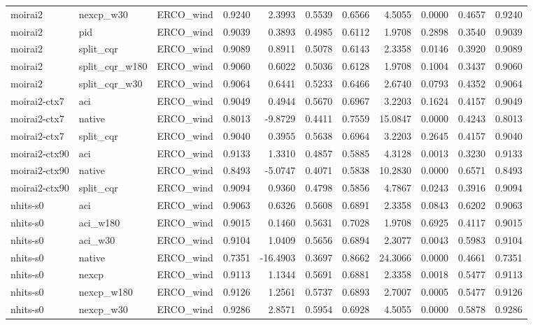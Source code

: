 \begin{tabular}{lllrrrrrrrr}
moirai2 & nexcp_w30 & ERCO_wind & 0.9240 & 2.3993 & 0.5539 & 0.6566 & 4.5055 & 0.0000 & 0.4657 & 0.9240 \\
moirai2 & pid & ERCO_wind & 0.9039 & 0.3893 & 0.4985 & 0.6112 & 1.9708 & 0.2898 & 0.3540 & 0.9039 \\
moirai2 & split_cqr & ERCO_wind & 0.9089 & 0.8911 & 0.5078 & 0.6143 & 2.3358 & 0.0146 & 0.3920 & 0.9089 \\
moirai2 & split_cqr_w180 & ERCO_wind & 0.9060 & 0.6022 & 0.5036 & 0.6128 & 1.9708 & 0.1004 & 0.3437 & 0.9060 \\
moirai2 & split_cqr_w30 & ERCO_wind & 0.9064 & 0.6441 & 0.5233 & 0.6466 & 2.6740 & 0.0793 & 0.4352 & 0.9064 \\
moirai2-ctx7 & aci & ERCO_wind & 0.9049 & 0.4944 & 0.5670 & 0.6967 & 3.2203 & 0.1624 & 0.4157 & 0.9049 \\
moirai2-ctx7 & native & ERCO_wind & 0.8013 & -9.8729 & 0.4411 & 0.7559 & 15.0847 & 0.0000 & 0.4243 & 0.8013 \\
moirai2-ctx7 & split_cqr & ERCO_wind & 0.9040 & 0.3955 & 0.5638 & 0.6964 & 3.2203 & 0.2645 & 0.4157 & 0.9040 \\
moirai2-ctx90 & aci & ERCO_wind & 0.9133 & 1.3310 & 0.4857 & 0.5885 & 4.3128 & 0.0013 & 0.3230 & 0.9133 \\
moirai2-ctx90 & native & ERCO_wind & 0.8493 & -5.0747 & 0.4071 & 0.5838 & 10.2830 & 0.0000 & 0.6571 & 0.8493 \\
moirai2-ctx90 & split_cqr & ERCO_wind & 0.9094 & 0.9360 & 0.4798 & 0.5856 & 4.7867 & 0.0243 & 0.3916 & 0.9094 \\
nhits-s0 & aci & ERCO_wind & 0.9063 & 0.6326 & 0.5608 & 0.6891 & 2.3358 & 0.0843 & 0.6202 & 0.9063 \\
nhits-s0 & aci_w180 & ERCO_wind & 0.9015 & 0.1460 & 0.5631 & 0.7028 & 1.9708 & 0.6925 & 0.4117 & 0.9015 \\
nhits-s0 & aci_w30 & ERCO_wind & 0.9104 & 1.0409 & 0.5656 & 0.6894 & 2.3077 & 0.0043 & 0.5983 & 0.9104 \\
nhits-s0 & native & ERCO_wind & 0.7351 & -16.4903 & 0.3697 & 0.8662 & 24.3066 & 0.0000 & 0.4661 & 0.7351 \\
nhits-s0 & nexcp & ERCO_wind & 0.9113 & 1.1344 & 0.5691 & 0.6881 & 2.3358 & 0.0018 & 0.5477 & 0.9113 \\
nhits-s0 & nexcp_w180 & ERCO_wind & 0.9126 & 1.2561 & 0.5737 & 0.6893 & 2.7007 & 0.0005 & 0.5477 & 0.9126 \\
nhits-s0 & nexcp_w30 & ERCO_wind & 0.9286 & 2.8571 & 0.5954 & 0.6928 & 4.5055 & 0.0000 & 0.5878 & 0.9286 \\

\end{tabular}
